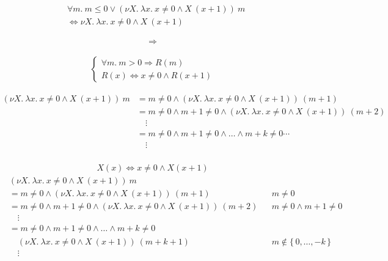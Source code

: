 \documentclass{jarticle}
\theoremstyle{definition}
\begin{document}
\begin{align*}
    &\forall m.\: m \leq 0 \vee
    (\nu X.\: \lambda x.\: x \neq 0
        \wedge X\ (x + 1))\ m \\
    &\Leftrightarrow \nu X.\: \lambda x.\: x \neq 0 \wedge X\ (x + 1)
\end{align*}

\begin{align*}
    \Rightarrow
\end{align*}

\begin{align*}
    \begin{cases}
        \forall m.\: m > 0 \Rightarrow R(m) \\
        R(x) \Leftrightarrow x \neq 0 \wedge R(x+1)
    \end{cases}
\end{align*}

\begin{align*}
  (\nu X.\: \lambda x.\: x \neq 0 \wedge X\ (x + 1))\ m
  &= m \neq 0 \wedge (\nu X.\: \lambda x.\: x \neq 0 \wedge X\ (x + 1))\ (m + 1)
    \\
  &= m \neq 0 \wedge m +1 \neq 0 \wedge (\nu X.\: \lambda x.\: x \neq 0 \wedge
          X\ (x + 1))\ (m + 2) \\
  &\quad \vdots \\
  &= m \neq 0 \wedge m +1 \neq 0 \wedge \dots \wedge m + k \neq 0 \cdots \\
  &\quad \vdots \\
\end{align*}

\begin{align*}
    X(x) \Leftrightarrow x \neq 0 \wedge X(x+1)
\end{align*}
\begin{align*}
  &(\nu X.\: \lambda x.\: x \neq 0 \wedge X\ (x + 1))\ m &&\\
  &= m \neq 0 \wedge (\nu X.\: \lambda x.\: x \neq 0 \wedge X\ (x + 1))\ (m + 1)
    &&m \neq 0 \\
  &= m \neq 0 \wedge m +1 \neq 0 \wedge (\nu X.\: \lambda x.\: x \neq 0 \wedge
          X\ (x + 1))\ (m + 2)  && m \neq 0 \wedge m + 1 \neq 0 \\
  &\quad \vdots &&\\
  &= m \neq 0 \wedge m +1 \neq 0 \wedge \dots \wedge m + k \neq 0 &&  \\
  &\quad (\nu X.\: \lambda x.\: x \neq 0 \wedge X\ (x + 1))\ (m + k + 1) &&
  m \not \in \{\, 0, \dots, -k \,\} \\
  &\quad \vdots &&\\
\end{align*}
\end{document}
